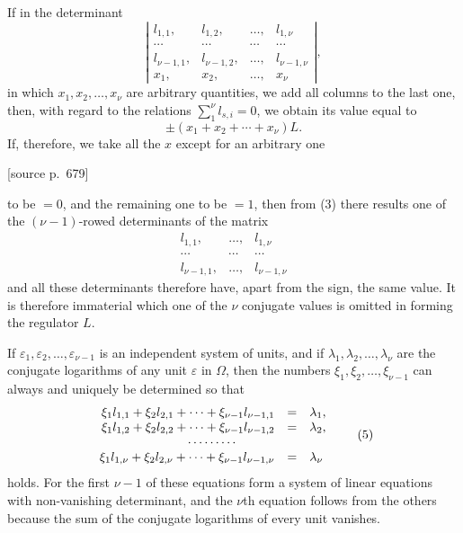 \documentclass[11pt]{article}
\newcommand{\srcpage}[1]{\par\medskip\noindent\textsf{[source p.~#1]}\par\smallskip}
\begin{document}
If in the determinant
\begin{equation}
\left|\begin{array}{cccc}
l_{1,1},&l_{1,2},&\ldots,&l_{1,\nu}\\
\cdots&\cdots&\cdots&\cdots\\
l_{\nu-1,1},&l_{\nu-1,2},&\ldots,&l_{\nu-1,\nu}\\
x_1,&x_2,&\ldots,&x_\nu
\end{array}\right|,
\tag{4}
\end{equation}
in which $x_1,x_2,\ldots,x_\nu$ are arbitrary quantities, we add all columns to the last one, then, with regard to the relations $\sum_{1}^{\nu}l_{s,i}=0$, we obtain its value equal to
\[
\pm(x_1+x_2+\cdots+x_\nu)L.
\]
If, therefore, we take all the $x$ except for an arbitrary one
\srcpage{679}
to be $=0$, and the remaining one to be $=1$, then from (3) there results one of the $(\nu-1)$-rowed determinants of the matrix
\[
\begin{array}{ccc}
l_{1,1},&\ldots,&l_{1,\nu}\\
\cdots&\cdots&\cdots\\
l_{\nu-1,1},&\ldots,&l_{\nu-1,\nu}
\end{array}
\]
and all these determinants therefore have, apart from the sign, the same value. It is therefore immaterial which one of the $\nu$ conjugate values is omitted in forming the regulator $L$.

If $\varepsilon_1,\varepsilon_2,\ldots,\varepsilon_{\nu-1}$ is an independent system of units, and if $\lambda_1,\lambda_2,\ldots,\lambda_\nu$ are the conjugate logarithms of any unit $\varepsilon$ in $\Omega$, then the numbers $\xi_1,\xi_2,\ldots,\xi_{\nu-1}$ can always and uniquely be determined so that
\begin{equation}
\begin{array}{rcl}
\xi_1l_{1,1}+\xi_2l_{2,1}+\cdots+\xi_{\nu-1}l_{\nu-1,1}&=&\lambda_1,\\
\xi_1l_{1,2}+\xi_2l_{2,2}+\cdots+\xi_{\nu-1}l_{\nu-1,2}&=&\lambda_2,\\
\multicolumn{3}{c}{\cdots\cdots\cdots}\,\\
\xi_1l_{1,\nu}+\xi_2l_{2,\nu}+\cdots+\xi_{\nu-1}l_{\nu-1,\nu}&=&\lambda_\nu
\end{array}
\tag{5}
\end{equation}
holds. For the first $\nu-1$ of these equations form a system of linear equations with non-vanishing determinant, and the $\nu$th equation follows from the others because the sum of the conjugate logarithms of every unit vanishes.
\end{document}
